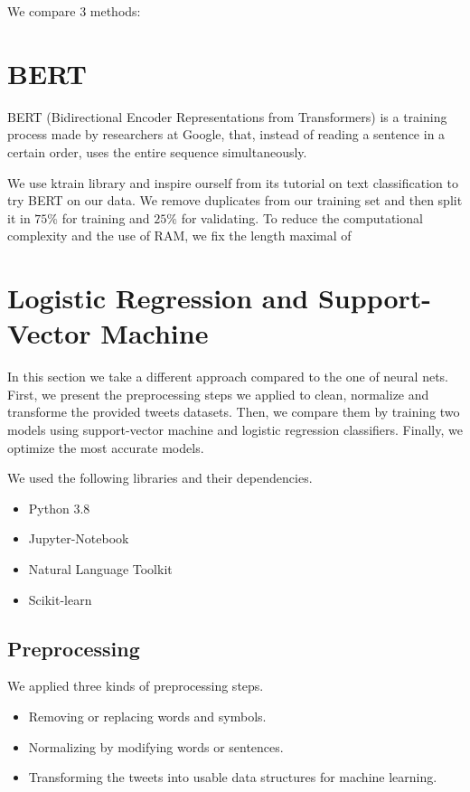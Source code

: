 \documentclass[11pt, a4paper, twocolumn]{article}
\begin{document}
We compare 3 methods:


\section{BERT}
BERT (Bidirectional Encoder Representations from Transformers)\cite{bertpaper} is a training process made by researchers at Google, that, instead of reading a sentence in a certain order, uses the entire sequence simultaneously.

We use ktrain library\cite{ktrain} and inspire ourself from its tutorial on text classification to try BERT on our data. We remove duplicates from our training set and then split it in $75\%$ for training and $25\%$ for validating. To reduce the computational complexity and the use of RAM, we fix the length maximal of 

\section{Logistic Regression and Support-Vector Machine}
In this section we take a different approach compared to the one of neural nets. First, we present the preprocessing steps we applied to clean, normalize and transforme the provided tweets datasets. Then, we compare them by training two models using support-vector machine and logistic regression classifiers. Finally, we optimize the most accurate models.

We used the following libraries and their dependencies.
\begin{itemize}
	\setlength\itemsep{1px}
	\item Python 3.8
	\item Jupyter-Notebook
	\item Natural Language Toolkit
	\item Scikit-learn
\end{itemize}

\subsection{Preprocessing}
We applied three kinds of preprocessing steps.
\begin{itemize}
	\setlength\itemsep{1px}
	\item Removing or replacing words and symbols.
	\item Normalizing by modifying words or sentences.
	\item Transforming the tweets into usable data structures for machine learning.
\end{itemize}
\end{document}

